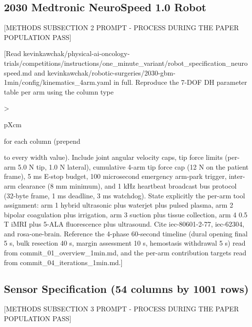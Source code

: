 \subsection{2030 Medtronic NeuroSpeed 1.0 Robot}
\label{sec:methods-robot}

[METHODS SUBSECTION 2 PROMPT - PROCESS DURING THE PAPER POPULATION PASS]

[Read
kevinkawchak/physical-ai-oncology-trials/competitions/instructions/one_minute_variant/robot_specification_neurospeed.md
and
kevinkawchak/robotic-surgeries/2030-gbm-1min/config/kinematics_4arm.yaml
in full. Reproduce the 7-DOF DH parameter table per arm using the
column type {>{\raggedright\arraybackslash}p{Xcm}} for each column
(prepend \raggedright\arraybackslash to every width value). Include
joint angular velocity caps, tip force limits (per-arm 5.0 N tip, 1.0 N
lateral), cumulative 4-arm tip force cap (12 N on the patient frame),
5 ms E-stop budget, 100 microsecond emergency arm-park trigger,
inter-arm clearance (8 mm minimum), and 1 kHz heartbeat broadcast bus
protocol (32-byte frame, 1 ms deadline, 3 ms watchdog). State
explicitly the per-arm tool assignment: arm 1 hybrid ultrasonic plus
waterjet plus pulsed plasma, arm 2 bipolar coagulation plus
irrigation, arm 3 suction plus tissue collection, arm 4 0.5 T iMRI
plus 5-ALA fluorescence plus ultrasound. Cite iec-80601-2-77,
iec-62304, and rosa-one-brain. Reference the 4-phase 60-second
timeline (dural opening final 5 s, bulk resection 40 s, margin
assessment 10 s, hemostasis withdrawal 5 s) read from
commit_01_overview_1min.md, and the per-arm contribution targets read
from commit_04_iterations_1min.md.]

\subsection{Sensor Specification (54 columns by 1001 rows)}
\label{sec:methods-sensors}

[METHODS SUBSECTION 3 PROMPT - PROCESS DURING THE PAPER POPULATION PASS]

